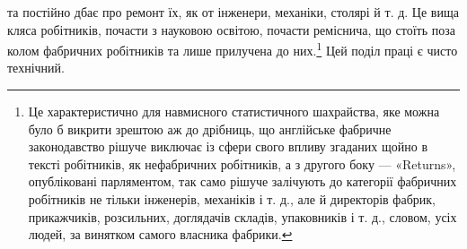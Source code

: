 \parcont{}  %
та постійно дбає про ремонт їх, як от інженери, механіки, столярі
й т. д. Це вища кляса робітників, почасти з науковою освітою,
почасти реміснича, що стоїть поза колом фабричних робітників
та лише прилучена до них.\footnote{
Це характеристично для навмисного статистичного шахрайства,
яке можна було б викрити зрештою аж до дрібниць, що англійське фабричне
законодавство рішуче виключає із сфери свого впливу згаданих щойно
в тексті робітників, як нефабричних робітників, а з другого боку —
«Returns», опубліковані парляментом, так само рішуче залічують до
категорії фабричних робітників не тільки інженерів, механіків і т. д.,
але й директорів фабрик, прикажчиків, розсильних, доглядачів складів,
упаковників і т. д., словом, усіх людей, за винятком самого власника
фабрики.
} Цей поділ праці є чисто технічний.

